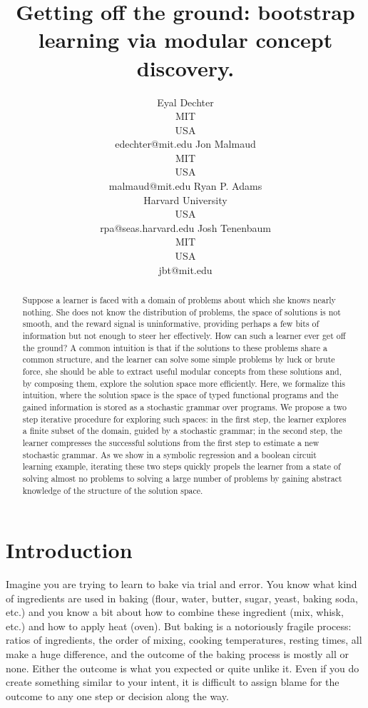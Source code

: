 \documentclass{article}
\title{Getting off the ground: bootstrap learning via modular concept discovery.}
\author{Eyal Dechter \\
MIT\\
USA \\
edechter@mit.edu
\And
Jon Malmaud \\
MIT \\ 
USA \\
malmaud@mit.edu
\And 
Ryan P.  Adams \\
Harvard University\\
USA \\
rpa@seas.harvard.edu
\And
Josh Tenenbaum \\
MIT\\
USA \\
jbt@mit.edu
}
\begin{document}
\maketitle

\begin{abstract}
 Suppose a learner is faced with a domain of problems about which she
 knows nearly nothing. She does not know the distribution of problems,
 the space of solutions is not smooth, and the reward signal is
 uninformative, providing perhaps a few bits of information but not
 enough to steer her effectively. How can such a learner ever get off
 the ground? A common intuition is that if the solutions to these
 problems share a common structure, and the learner can solve some
 simple problems by luck or brute force, she should be able to extract
 useful modular concepts from these solutions and, by composing them,
 explore the solution space more efficiently. Here, we formalize this
 intuition, where the solution space is the space of typed functional
 programs and the gained information is stored as a stochastic grammar
 over programs. We propose a two step iterative procedure for
 exploring such spaces: in the first step, the learner explores a
 finite subset of the domain, guided by a stochastic grammar; in the
 second step, the learner compresses the successful solutions from the
 first step to estimate a new stochastic grammar. As we show in a
 symbolic regression and a boolean circuit learning example, iterating
 these two steps quickly propels the learner from a state of solving
 almost no problems to solving a large number of problems by gaining
 abstract knowledge of the structure of the solution space.
\end{abstract}

\section{Introduction}

Imagine you are trying to learn to bake via trial and error. You know
what kind of ingredients are used in baking (flour, water, butter,
sugar, yeast, baking soda, etc.) and you know a bit about how to
combine these ingredient (mix, whisk, etc.) and how to apply heat
(oven). But baking is a notoriously fragile process: ratios of
ingredients, the order of mixing, cooking temperatures, resting times,
all make a huge difference, and the outcome of the baking process is
mostly all or none. Either the outcome is what you expected or quite
unlike it. Even if you do create something similar to your intent, it
is difficult to assign blame for the outcome to any one step or
decision along the way. 
\end{document}
